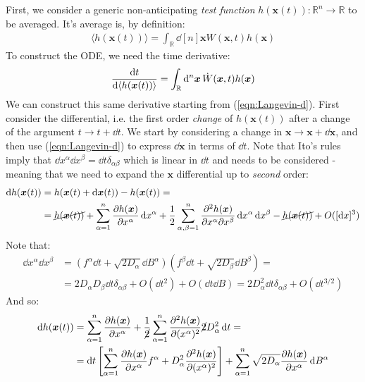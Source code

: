 \documentclass[../template.tex]{subfiles}
\begin{document}
\begin{exo}
    First, we consider a generic non-anticipating \textit{test function} $h(\bm{x}(t)) \colon \mathbb{R}^n \to \mathbb{R}$ to be averaged. It's average is, by definition:
    \begin{align*}
        \langle h(\bm{x}(t)) \rangle = \int_{\mathbb{R}} \dd[n]{\bm{x}} W(\bm{x},t) h(\bm{x})
    \end{align*} 
    To construct the ODE, we need the time derivative:
    \begin{align}
        \dv{t} {\langle h(\bm{x}(t)) \rangle} = \int_{\mathbb{R}} \dd[n]{\bm{x}} \dot{W}(\bm{x},t) h(\bm{x}) \label{eqn:dt-1}
    \end{align}
    We can construct this same derivative starting from (\ref{eqn:Langevin-d}). First consider the differential, i.e. the first order \textit{change} of $h(\bm{x}(t))$ after a change of the argument $t \to t+\dd{t}$. We start by considering a change in $\bm{x} \to \bm{x}+\dd{\bm{x}}$, and then use (\ref{eqn:Langevin-d}) to express $\dd{\bm{x}}$ in terms of $\dd{t}$. Note that Ito's rules imply that $\dd{x^\alpha}\dd{x^\beta} = \dd{t} \delta_{\alpha \beta}$ which is linear in $\dd{t}$ and needs to be considered - meaning that we need to expand the $\bm{x}$ differential up to \textit{second} order:  
    \begin{align*}
        \dd{h(\bm{x}(t))} &= h(\bm{x}(t) + \dd{\bm{x}(t)}) - h(\bm{x}(t)) = \\
        &= \cancel{h(\bm{x}(t))} + \sum_{\alpha=1}^n \pdv{h(\bm{x})}{x^\alpha} \dd{x^\alpha} + \frac{1}{2} \sum_{\alpha, \beta=1}^n \pdv{h(\bm{x})}{x^\alpha}{x^\beta} \dd{x^\alpha}\dd{x^\beta}  - \cancel{h(\bm{x}(t))} + O([\dd{x}]^3)
    \end{align*}
    Note that:
    \begin{align*}
        \dd{x^\alpha}\dd{x^\beta} &= (f^\alpha \dd{t} + \sqrt{2D_\alpha} \dd{B^\alpha})(f^\beta \dd{t} + \sqrt{2 D_\beta} \dd{B^\beta}) =\\
        &= 2 D_\alpha D_\beta\dd{t} \delta_{\alpha \beta}+ O(\dd{t}^2) + O(\dd{t} \dd{B}) = 2 D_\alpha^2 \dd{t} \delta_{\alpha \beta} + O(\dd{t}^{3/2})
    \end{align*}
    And so:
    \begin{align*}
        \dd{h(\bm{x}(t))} &= \sum_{\alpha=1}^n \pdv{h(\bm{x})}{x^\alpha} (f^\alpha \dd{t} + \sqrt{2 D_\alpha} \dd{B}^\alpha) + \frac{1}{\cancel{2}} \sum_{\alpha=1}^n \pdv[2]{h(\bm{x})}{(x^\alpha)} \cancel{2} D_\alpha^2 \dd{t} = \\
        &= \dd{t} \left[\sum_{\alpha=1}^n \pdv{h(\bm{x})}{x^\alpha} f^\alpha + D_\alpha^2 \pdv[2]{h(\bm{x})}{(x^\alpha)} \right] + \sum_{\alpha=1}^n \sqrt{2 D_\alpha}\pdv{h(\bm{x})}{x^\alpha} \dd{B^\alpha}

\end{align*}
\end{exo}
\end{document}
